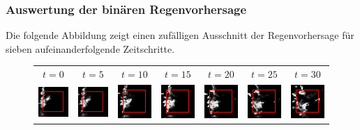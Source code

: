 
\subsubsection{Auswertung der binären Regenvorhersage}
Die folgende Abbildung zeigt einen zufälligen Ausschnitt der Regenvorhersage für sieben aufeinanderfolgende Zeitschritte.\\
\newpage
\begin{figure}[h]
\begin{tabular}{lllllll}
\multicolumn{1}{c}{$t = 0$}  &
\multicolumn{1}{c}{$t = 5$}  &
\multicolumn{1}{c}{$t = 10$}  &
\multicolumn{1}{c}{$t = 15$}  &
\multicolumn{1}{c}{$t = 20$}  &
\multicolumn{1}{c}{$t = 25$}  &
\multicolumn{1}{c}{$t = 30$}  \\

\includegraphics[width=20mm]{abb/prediction/100_input_maxCont}&
\includegraphics[width=20mm]{abb/prediction/101_input_maxCont}&
\includegraphics[width=20mm]{abb/prediction/102_input_maxCont}&
\includegraphics[width=20mm]{abb/prediction/103_input_maxCont}&
\includegraphics[width=20mm]{abb/prediction/104_input_maxCont}&
\includegraphics[width=20mm]{abb/prediction/105_input_maxCont}&
\includegraphics[width=20mm]{abb/prediction/106_input_maxCont}\\


\end{tabular}
\end{figure}
